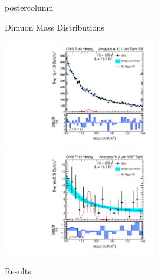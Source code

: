 \documentclass[final,hyperref={pdfpagelabels=false}]{beamer}
\newlength{\columnheight}
\begin{document}
\begin{frame}
\begin{columns}
    \begin{column}{.49\textwidth}
      \begin{beamercolorbox}[center,wd=\textwidth]{postercolumn}
        \begin{minipage}[T]{.95\textwidth} %
          \parbox[t][\columnheight]{\textwidth}{ %
            \begin{block}{Dimuon Mass Distributions}
              \begin{center}
                \includegraphics[width=0.5\textwidth]{plotsPublic/mass_AnanlysisA/pdf/CombSplitAll_8TeV_125_Jets01PassPtG10BB.pdf}
                \includegraphics[width=0.5\textwidth]{plotsPublic/mass_AnanlysisA/pdf/CombSplitAll_8TeV_125_Jet2CutsVBFPass.pdf}
              \end{center}
            \end{block}
            \vfill
            \begin{block}{Results}

\end{block}}
\end{minipage}
\end{beamercolorbox}
\end{column}
\end{columns}
\end{frame}
\end{document}
